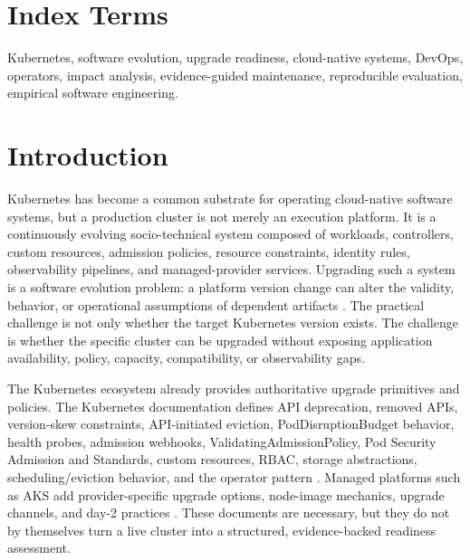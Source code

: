 \documentclass[10pt,journal]{IEEEtran}
\begin{document}
\section*{Index Terms}
Kubernetes, software evolution, upgrade readiness, cloud-native systems, DevOps, operators, impact analysis, evidence-guided maintenance, reproducible evaluation, empirical software engineering.

\section{Introduction}
Kubernetes has become a common substrate for operating cloud-native software systems, but a production cluster is not merely an execution platform. It is a continuously evolving socio-technical system composed of workloads, controllers, custom resources, admission policies, resource constraints, identity rules, observability pipelines, and managed-provider services. Upgrading such a system is a software evolution problem: a platform version change can alter the validity, behavior, or operational assumptions of dependent artifacts \cite{lehman1980,mens2008,bohner1996}. The practical challenge is not only whether the target Kubernetes version exists. The challenge is whether the specific cluster can be upgraded without exposing application availability, policy, capacity, compatibility, or observability gaps.

The Kubernetes ecosystem already provides authoritative upgrade primitives and policies. The Kubernetes documentation defines API deprecation, removed APIs, version-skew constraints, API-initiated eviction, PodDisruptionBudget behavior, health probes, admission webhooks, ValidatingAdmissionPolicy, Pod Security Admission and Standards, custom resources, RBAC, storage abstractions, scheduling/eviction behavior, and the operator pattern \cite{kubernetesDeprecationPolicy,kubernetesDeprecationGuide,kubernetesVersionSkew,kubernetesEviction,kubernetesDisruptions,kubernetesPdbTask,kubernetesProbes,kubernetesAdmissionWebhooks,kubernetesAdmissionWebhooksGoodPractices,kubernetesValidatingAdmissionPolicy,kubernetesPodSecurityAdmission,kubernetesPodSecurityStandards,kubernetesCustomResources,kubernetesRbac,kubernetesRbacGoodPractices,kubernetesPersistentVolumes,kubernetesSchedulingEviction,kubernetesOperatorPattern}. Managed platforms such as AKS add provider-specific upgrade options, node-image mechanics, upgrade channels, and day-2 practices \cite{aksUpgradeOptions,aksNodeImage,aksDay2}. These documents are necessary, but they do not by themselves turn a live cluster into a structured, evidence-backed readiness assessment.
\end{document}
